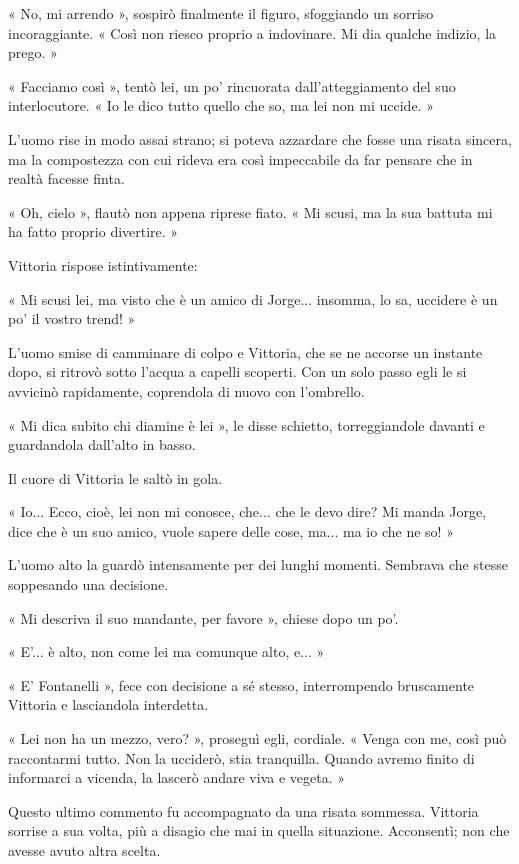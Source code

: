 « No, mi arrendo », sospirò finalmente il figuro, sfoggiando un sorriso incoraggiante. « Così non riesco proprio a indovinare. Mi dia qualche indizio, la prego. »

« Facciamo così », tentò lei, un po' rincuorata dall'atteggiamento del suo interlocutore. « Io le dico tutto quello che so, ma lei non mi uccide. »

L'uomo rise in modo assai strano; si poteva azzardare che fosse una risata sincera, ma la compostezza con cui rideva era così impeccabile da far pensare che in realtà facesse finta.

« Oh, cielo », flautò non appena riprese fiato. « Mi scusi, ma la sua battuta mi ha fatto proprio divertire. »

Vittoria rispose istintivamente:

« Mi scusi lei, ma visto che è un amico di Jorge... insomma, lo sa, uccidere è un po' il vostro trend! »

L'uomo smise di camminare di colpo e Vittoria, che se ne accorse un instante dopo, si ritrovò sotto l'acqua a capelli scoperti. Con un solo passo egli le si avvicinò rapidamente, coprendola di nuovo con l'ombrello.

« Mi dica subito chi diamine è lei », le disse schietto, torreggiandole davanti e guardandola dall'alto in basso.

Il cuore di Vittoria le saltò in gola.

« Io... Ecco, cioè, lei non mi conosce, che... che le devo dire? Mi manda Jorge, dice che è un suo amico, vuole sapere delle cose, ma... ma io che ne so! »

L'uomo alto la guardò intensamente per dei lunghi momenti. Sembrava che stesse soppesando una decisione.

« Mi descriva il suo mandante, per favore », chiese dopo un po'.

« E'... è alto, non come lei ma comunque alto, e... »

« E' Fontanelli », fece con decisione a sé stesso, interrompendo bruscamente Vittoria e lasciandola interdetta.

« Lei non ha un mezzo, vero? », proseguì egli, cordiale. « Venga con me, così può raccontarmi tutto. Non la ucciderò, stia tranquilla. Quando avremo finito di informarci a vicenda, la lascerò andare viva e vegeta. »

Questo ultimo commento fu accompagnato da una risata sommessa. Vittoria sorrise a sua volta, più a disagio che mai in quella situazione. Acconsentì; non che avesse avuto altra scelta.

